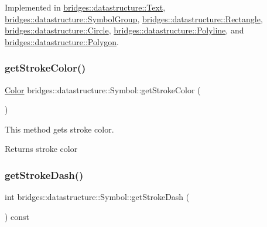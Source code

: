 Implemented in \hyperlink{classbridges_1_1datastructure_1_1_text_a039d614f2f74fe4dbb74e7b3410f53d9}{bridges\+::datastructure\+::\+Text}, \hyperlink{classbridges_1_1datastructure_1_1_symbol_group_a64dfd163d201b6759b1d21f90584e670}{bridges\+::datastructure\+::\+Symbol\+Group}, \hyperlink{classbridges_1_1datastructure_1_1_rectangle_abb3d8cace529aae9a405909844ed1ae0}{bridges\+::datastructure\+::\+Rectangle}, \hyperlink{classbridges_1_1datastructure_1_1_circle_aa865c28869b28bbf6416e5a36b7f5102}{bridges\+::datastructure\+::\+Circle}, \hyperlink{classbridges_1_1datastructure_1_1_polyline_a5cd5cf2265353c90e91564121583aed1}{bridges\+::datastructure\+::\+Polyline}, and \hyperlink{classbridges_1_1datastructure_1_1_polygon_a9e575d921e7883815f4505ebb13fffe4}{bridges\+::datastructure\+::\+Polygon}.

\mbox{\label{classbridges_1_1datastructure_1_1_symbol_aa99d36f97deaf99bee1d61778c85e87d}} 
\subsubsection{\texorpdfstring{get\+Stroke\+Color()}{getStrokeColor()}}
{\footnotesize\ttfamily \hyperlink{classbridges_1_1datastructure_1_1_color}{Color} bridges\+::datastructure\+::\+Symbol\+::get\+Stroke\+Color (\begin{DoxyParamCaption}{ }\end{DoxyParamCaption})\hspace{0.3cm}{\ttfamily [inline]}}



This method gets stroke color. 

\begin{DoxyReturn}{Returns}
stroke color 
\end{DoxyReturn}
\mbox{\label{classbridges_1_1datastructure_1_1_symbol_a1a47a1a3b4bedf3486e4f48b5979da1a}} 
\subsubsection{\texorpdfstring{get\+Stroke\+Dash()}{getStrokeDash()}}
{\footnotesize\ttfamily int bridges\+::datastructure\+::\+Symbol\+::get\+Stroke\+Dash (\begin{DoxyParamCaption}{ }\end{DoxyParamCaption}) const\hspace{0.3cm}{\ttfamily [inline]}}



